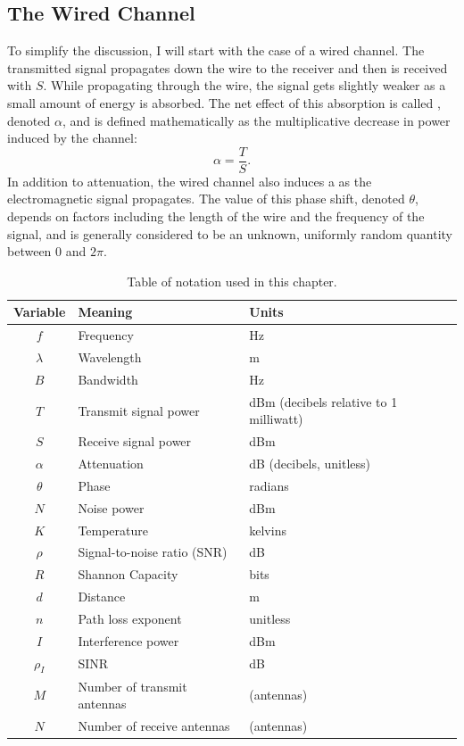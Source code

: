 \subsection{The Wired Channel}
To simplify the discussion, I will start with the case of a wired channel. The transmitted signal propagates down the wire to the receiver and then is received with  $S$. While propagating through the wire, the signal gets slightly weaker as a small amount of energy is absorbed. The net effect of this absorption is called , denoted $\alpha$, and is defined mathematically as the multiplicative decrease in power induced by the channel:
\begin{equation}
	\label{eq:attenuation}
	\alpha = \frac{T}{S}.
\end{equation}
In addition to attenuation, the wired channel also induces a  as the electromagnetic signal propagates. The value of this phase shift, denoted $\theta$, depends on factors including the length of the wire and the frequency of the signal, and is generally considered to be an unknown, uniformly random quantity between $0$ and $2\pi$.

\begin{table}
\centering
\begin{tabular}{cll}
\toprule%
Variable & Meaning & Units\\
\midrule%
$f$ & Frequency & Hz \\
$\lambda$ & Wavelength & m \\
$B$ & Bandwidth & Hz \\
$T$ & Transmit signal power & dBm (decibels relative to 1 milliwatt) \\
$S$ & Receive signal power & dBm \\
$\alpha$ & Attenuation & dB (decibels, unitless) \\
$\theta$ & Phase & radians \\
$N$ & Noise power & dBm \\
$K$ & Temperature & kelvins \\
$\rho$ & Signal-to-noise ratio (SNR) & dB \\
$R$ & Shannon Capacity & bits \\
$d$ & Distance & m \\
$n$ & Path loss exponent & unitless \\
$I$ & Interference power & dBm \\
$\rho_I$ & SINR & dB \\
$M$ & Number of transmit antennas & (antennas) \\
$N$ & Number of receive antennas & (antennas)\\
\bottomrule
\end{tabular}
\caption[Table of notation used in this chapter]{\label{tab:bg_notation}Table of notation used in this chapter.}
\end{table}


